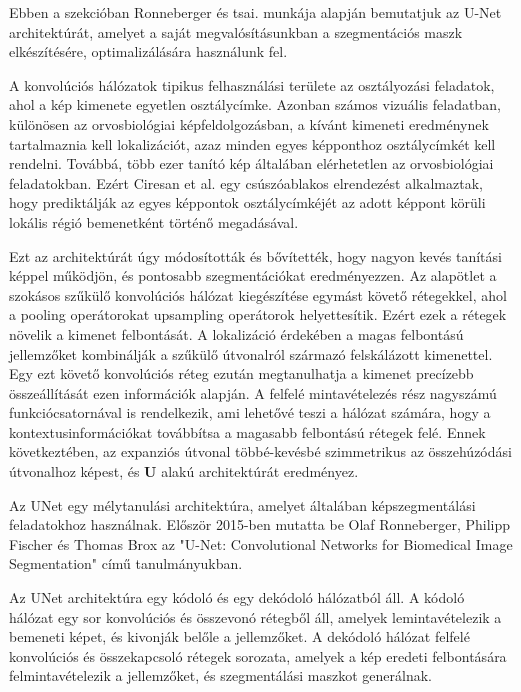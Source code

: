 \documentclass[12pt,a4]{article}
\begin{document}
                Ebben a szekcióban \cite{unet}Ronneberger és tsai. munkája alapján bemutatjuk az U-Net architektúrát, amelyet a saját megvalósításunkban a szegmentációs maszk elkészítésére, optimalizálására használunk fel. 
    
                A konvolúciós hálózatok tipikus felhasználási területe az osztályozási feladatok, ahol a kép kimenete egyetlen osztálycímke. Azonban számos vizuális feladatban, különösen az orvosbiológiai képfeldolgozásban, a kívánt kimeneti eredménynek tartalmaznia kell lokalizációt, azaz minden egyes képponthoz osztálycímkét kell rendelni. Továbbá, több ezer tanító kép általában elérhetetlen az orvosbiológiai feladatokban. Ezért Ciresan et al. \cite{ciresan} egy csúszóablakos elrendezést alkalmaztak, hogy prediktálják
                az egyes képpontok osztálycímkéjét az adott képpont körüli lokális régió bemenetként történő megadásával.
    
                Ezt az architektúrát úgy módosították és bővítették, hogy
                nagyon kevés tanítási képpel működjön, és pontosabb szegmentációkat eredményezzen.
                Az alapötlet a szokásos szűkülő konvolúciós hálózat kiegészítése egymást követő rétegekkel, ahol a pooling operátorokat upsampling operátorok helyettesítik. Ezért ezek a rétegek növelik a kimenet felbontását. A lokalizáció érdekében a magas felbontású jellemzőket kombinálják a szűkülő útvonalról származó felskálázott kimenettel. Egy ezt követő konvolúciós réteg ezután megtanulhatja a kimenet precízebb összeállítását ezen információk alapján. A felfelé mintavételezés rész nagyszámú funkciócsatornával is rendelkezik, ami lehetővé teszi a hálózat számára, hogy a kontextusinformációkat továbbítsa a magasabb felbontású rétegek felé. Ennek következtében, az expanziós útvonal többé-kevésbé szimmetrikus az összehúzódási útvonalhoz képest, és \textbf{U} alakú architektúrát eredményez.
    
                Az UNet egy mélytanulási architektúra, amelyet általában képszegmentálási feladatokhoz használnak. Először 2015-ben mutatta be \cite{unet}Olaf Ronneberger, Philipp Fischer és Thomas Brox az "U-Net: Convolutional Networks for Biomedical Image Segmentation" című tanulmányukban.
    
                Az UNet architektúra egy kódoló és egy dekódoló hálózatból áll. A kódoló hálózat egy sor konvolúciós és összevonó rétegből áll, amelyek lemintavételezik a bemeneti képet, és kivonják belőle a jellemzőket. A dekódoló hálózat felfelé konvolúciós és összekapcsoló rétegek sorozata, amelyek a kép eredeti felbontására felmintavételezik a jellemzőket, és szegmentálási maszkot generálnak.
    
\end{document}
